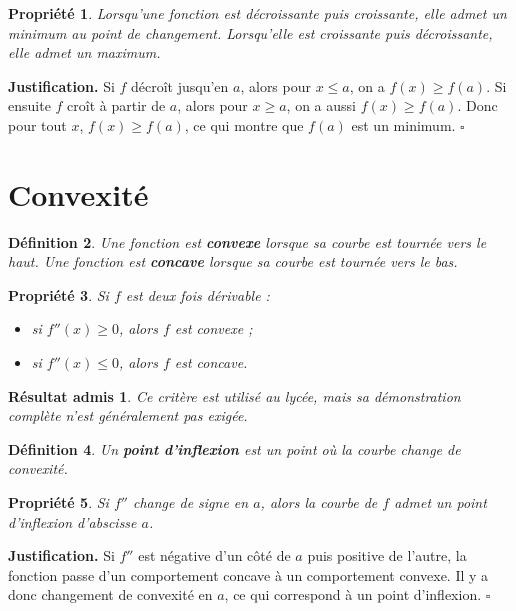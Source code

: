 \documentclass[11pt,a4paper]{article}
\newtheorem{definition}{Définition}[section]
\newtheorem{propriete}[definition]{Propriété}
\newtheorem*{admis}{Résultat admis}
\begin{document}
\begin{propriete}
Lorsqu'une fonction est décroissante puis croissante, elle admet un minimum au point de changement. Lorsqu'elle est croissante puis décroissante, elle admet un maximum.
\end{propriete}

\textbf{Justification.}  
Si \(f\) décroît jusqu'en \(a\), alors pour \(x\le a\), on a \(f(x)\ge f(a)\).  
Si ensuite \(f\) croît à partir de \(a\), alors pour \(x\ge a\), on a aussi \(f(x)\ge f(a)\).  
Donc pour tout \(x\), \(f(x)\ge f(a)\), ce qui montre que \(f(a)\) est un minimum. \(\square\)

\section{Convexité}

\begin{definition}
Une fonction est \textbf{convexe} lorsque sa courbe est tournée vers le haut.  
Une fonction est \textbf{concave} lorsque sa courbe est tournée vers le bas.
\end{definition}

\begin{propriete}
Si \(f\) est deux fois dérivable :
\begin{itemize}
    \item si \(f''(x)\ge 0\), alors \(f\) est convexe ;
    \item si \(f''(x)\le 0\), alors \(f\) est concave.
\end{itemize}
\end{propriete}

\begin{admis}
Ce critère est utilisé au lycée, mais sa démonstration complète n'est généralement pas exigée.
\end{admis}

\begin{definition}
Un \textbf{point d'inflexion} est un point où la courbe change de convexité.
\end{definition}

\begin{propriete}
Si \(f''\) change de signe en \(a\), alors la courbe de \(f\) admet un point d'inflexion d'abscisse \(a\).
\end{propriete}

\textbf{Justification.}  
Si \(f''\) est négative d'un côté de \(a\) puis positive de l'autre, la fonction passe d'un comportement concave à un comportement convexe. Il y a donc changement de convexité en \(a\), ce qui correspond à un point d'inflexion. \(\square\)
\end{document}
